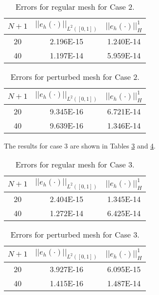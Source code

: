 \documentclass[a4paper, 12pt]{article}
\begin{document}
\begin{table}[!ht]
\caption{Errors for regular mesh for Case 2.}
\vspace{0.1in}
\centering
\begin{tabular}{|c|c|c|}
\hline
 $N+1$&  $||e_h(\cdot)||_{L^2([0,1])}$ & $||e_h(\cdot)||_H^1$ \\
 \hline
     20  & 2.196E-15 & 1.240E-14 \\
     40  & 1.197E-14 & 5.959E-14 \\
\hline
\end{tabular}
\label{tab:C2o}
\end{table}

\begin{table}[!ht]
\caption{Errors for perturbed mesh for Case 2.}
\vspace{0.1in}
\centering
\begin{tabular}{|c|c|c|}
\hline
 $N+1$  & $||e_h(\cdot)||_{L^2([0,1])}$ & $||e_h(\cdot)||_H^1$ \\
 \hline
     20  & 9.345E-16 & 6.721E-14 \\
     40  & 9.639E-16 & 1.346E-14 \\
\hline
\end{tabular}
\label{tab:C2p}
\end{table}

The results for case 3 are shown in Tables \ref{tab:C3o}
and \ref{tab:C3p}.

\begin{table}[!ht]
\caption{Errors for regular mesh for Case 3.}
\vspace{0.1in}
\centering
\begin{tabular}{|c|c|c|}
\hline
 $N+1$&  $||e_h(\cdot)||_{L^2([0,1])}$ & $||e_h(\cdot)||_H^1$ \\
 \hline
     20  & 2.404E-15 & 1.345E-14 \\
     40  & 1.272E-14 & 6.425E-14 \\
\hline
\end{tabular}
\label{tab:C3o}
\end{table}

\begin{table}[!ht]
\caption{Errors for perturbed mesh for Case 3.}
\vspace{0.1in}
\centering
\begin{tabular}{|c|c|c|}
\hline
 $N+1$  & $||e_h(\cdot)||_{L^2([0,1])}$ & $||e_h(\cdot)||_H^1$ \\
 \hline
     20  & 3.927E-16 & 6.095E-15 \\
     40  & 1.415E-16 & 1.487E-14 \\
\hline
\end{tabular}
\label{tab:C3p}
\end{table}
\end{document}
